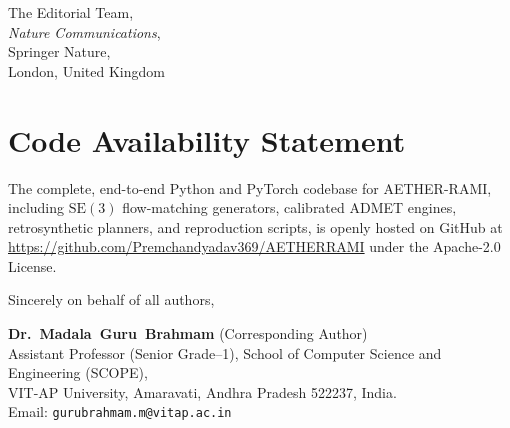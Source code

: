 \documentclass[11pt]{letter}
\begin{document}
\begin{letter}{%
    The Editorial Team,\\
    \textit{Nature Communications},\\
    Springer Nature,\\
    London, United Kingdom
}
\section*{Code Availability Statement}
The complete, end-to-end Python and PyTorch codebase for AETHER-RAMI, including $\mathrm{SE}(3)$ flow-matching generators, calibrated ADMET engines, retrosynthetic planners, and reproduction scripts, is openly hosted on GitHub at \url{https://github.com/Premchandyadav369/AETHERRAMI} under the Apache-2.0 License.

\vspace{1em}
\closing{Sincerely on behalf of all authors,}

\noindent
\textbf{Dr.~Madala~Guru~Brahmam} (Corresponding Author)\\
Assistant Professor (Senior Grade--1), School of Computer Science and Engineering (SCOPE),\\
VIT-AP University, Amaravati, Andhra Pradesh 522237, India.\\
Email: \texttt{gurubrahmam.m@vitap.ac.in}

\end{letter}
\end{document}
